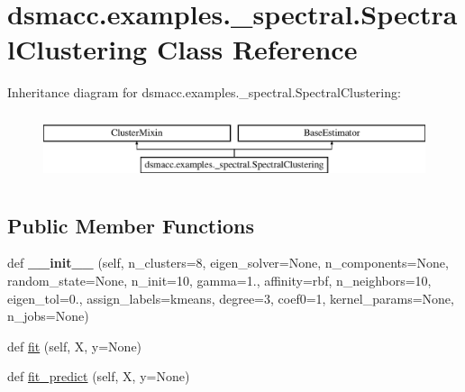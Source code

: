 \hypertarget{classdsmacc_1_1examples_1_1__spectral_1_1SpectralClustering}{}\section{dsmacc.\+examples.\+\_\+spectral.\+Spectral\+Clustering Class Reference}
\label{classdsmacc_1_1examples_1_1__spectral_1_1SpectralClustering}
Inheritance diagram for dsmacc.\+examples.\+\_\+spectral.\+Spectral\+Clustering\+:\begin{figure}[H]
\begin{center}
\leavevmode
\includegraphics[height=1.978799cm]{classdsmacc_1_1examples_1_1__spectral_1_1SpectralClustering}
\end{center}
\end{figure}
\subsection*{Public Member Functions}
\begin{DoxyCompactItemize}
\item 
\mbox{\label{classdsmacc_1_1examples_1_1__spectral_1_1SpectralClustering_a850315e1678fb3638054fd7e3db1de60}} 
def {\bfseries \+\_\+\+\_\+init\+\_\+\+\_\+} (self, n\+\_\+clusters=8, eigen\+\_\+solver=None, n\+\_\+components=None, random\+\_\+state=None, n\+\_\+init=10, gamma=1., affinity=\textquotesingle{}rbf\textquotesingle{}, n\+\_\+neighbors=10, eigen\+\_\+tol=0., assign\+\_\+labels=\textquotesingle{}kmeans\textquotesingle{}, degree=3, coef0=1, kernel\+\_\+params=None, n\+\_\+jobs=None)
\item 
def \mbox{\hyperlink{classdsmacc_1_1examples_1_1__spectral_1_1SpectralClustering_a5af13c6812bd105744f4682a0f084511}{fit}} (self, X, y=None)
\item 
def \mbox{\hyperlink{classdsmacc_1_1examples_1_1__spectral_1_1SpectralClustering_a2199033bd2458f93914ca1a1ad26ca23}{fit\+\_\+predict}} (self, X, y=None)
\end{DoxyCompactItemize}
